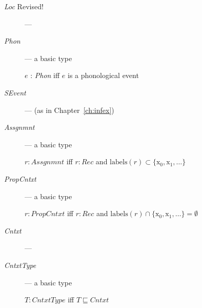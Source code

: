 \begin{description}

  \item[\textnormal{\textit{Loc}} Revised!] --- 

  
\item[\textnormal{\textit{Phon}}] --- a basic type

  $e$ : \textit{Phon} iff $e$ is a phonological event
  
\item[\textnormal{\textit{SEvent}}] ---  (as in
      Chapter~\ref{ch:infex})

    \item[\textnormal{\textit{Assgnmnt}}] --- a basic type

      $r:\textit{Assgnmnt}$ iff
$r:\textit{Rec}$ and
$\mathrm{labels}(r)\subset\{\text{x}_0,\text{x}_1,\ldots\}$

\item[\textnormal{\textit{PropCntxt}}] --- a basic type

  $r:\textit{PropCntxt}$ iff
$r:\textit{Rec}$ and
$\mathrm{labels}(r)\cap\{\text{x}_0,\text{x}_1,\ldots\}=\emptyset$

\item[\textnormal{\textit{Cntxt}}] --- 

    \item[\textnormal{\textit{CntxtType}}] --- a basic type

    $T:\textit{CntxtType}$ iff $T\sqsubseteq\textit{Cntxt}$
      


\end{description}
